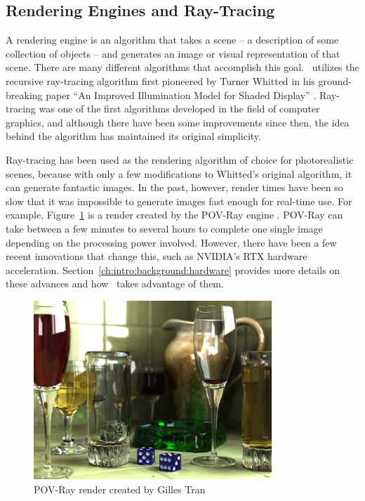 \subsection{Rendering Engines and Ray-Tracing}
\label{ch:intro:overview:raytracing}

A rendering engine is an algorithm that takes a scene -- a description of some collection of objects -- and generates an image or visual representation of that scene.
There are many different algorithms that accomplish this goal.
\name\ utilizes the recursive ray-tracing algorithm first pioneered by Turner Whitted in his ground-breaking paper ``An Improved Illumination Model for Shaded Display'' \cite{whitted1980improved}.
Ray-tracing was one of the first algorithms developed in the field of computer graphics, and although there have been some improvements since then, the idea behind the algorithm has maintained its original simplicity.

Ray-tracing has been used as the rendering algorithm of choice for photorealistic scenes, because with only a few modifications to Whitted's original algorithm, it can generate fantastic images.
In the past, however, render times have been so slow that it was impossible to generate images fast enough for real-time use.
For example, Figure~\ref{fig:povray_render} is a render created by the POV-Ray engine \cite{povray}.
POV-Ray can take between a few minutes to several hours to complete one single image depending on the processing power involved.
However, there have been a few recent innovations that change this, such as NVIDIA's RTX hardware acceleration.
Section~\ref{ch:intro:background:hardware} provides more details on these advances and how \name\ takes advantage of them.

\begin{figure}[htb]
  \centering
  \includegraphics[width=0.8\textwidth]{resources/glasses_povray}
  \caption{POV-Ray render created by Gilles Tran \cite{povray2006render}}
  \label{fig:povray_render}
\end{figure}


